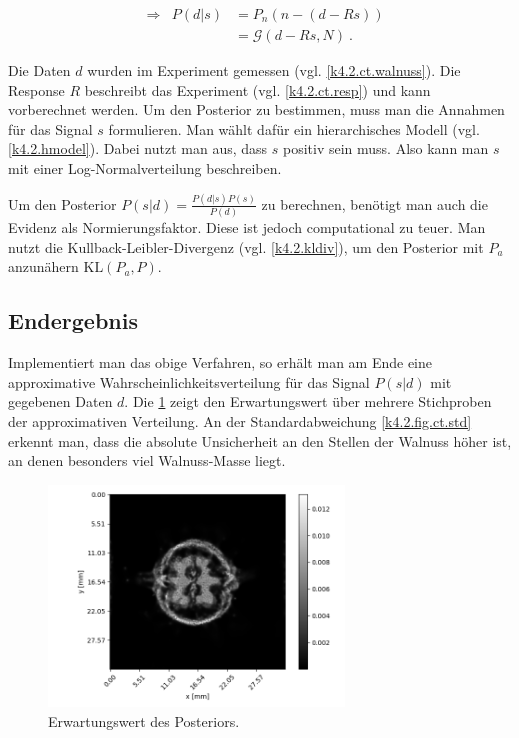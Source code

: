 \begin{equation}
  \begin{aligned}
    &\Rightarrow& P(d|s) &= P_n(n-(d-Rs)) \\ 
    && &= \mathcal{G}(d-Rs,N) \ .
  \end{aligned}
\end{equation}

Die Daten $d$ wurden im Experiment gemessen (vgl. \cref{k4.2.ct.walnuss}). Die Response $R$ beschreibt das Experiment (vgl. \cref{k4.2.ct.resp}) und kann vorberechnet werden. Um den Posterior zu bestimmen, muss man die Annahmen für das Signal $s$ formulieren. Man wählt dafür ein hierarchisches Modell (vgl. \cref{k4.2.hmodel}). Dabei nutzt man aus, dass $s$ positiv sein muss. Also kann man $s$ mit einer Log-Normalverteilung beschreiben. 

Um den Posterior $P(s|d) = \frac{P(d|s)P(s)}{P(d)}$ zu berechnen, benötigt man auch die Evidenz als Normierungsfaktor. Diese ist jedoch computational zu teuer. Man nutzt die Kullback-Leibler-Divergenz (vgl. \cref{k4.2.kldiv}), um den Posterior mit $P_a$ anzunähern $\mathrm{KL}(P_a,P)$. 


\subsection{Endergebnis}

Implementiert man das obige Verfahren, so erhält man am Ende eine approximative Wahrscheinlichkeitsverteilung für das Signal $P(s|d)$ mit gegebenen Daten $d$. Die \cref{k4.2.fig.ct.mean} zeigt den Erwartungswert über mehrere Stichproben der approximativen Verteilung. An der Standardabweichung \cref{k4.2.fig.ct.std} erkennt man, dass die absolute Unsicherheit an den Stellen der Walnuss höher ist, an denen besonders viel Walnuss-Masse liegt. 

\begin{figure}
  \centering
  \includegraphics[width=0.7\textwidth]{k4.2/ct-walnuss-mean.png}
  \caption{Erwartungswert des Posteriors.}
  \label{k4.2.fig.ct.mean}
\end{figure}

